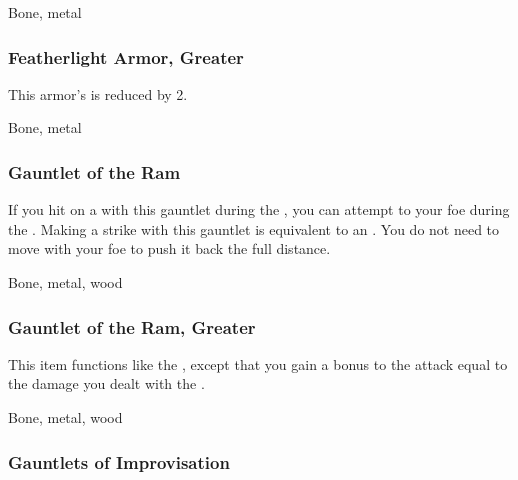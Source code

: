  Bone, metal


\lowercase{\hypertarget{item:Featherlight Armor, Greater}{}}\label{item:Featherlight Armor, Greater}
\hypertarget{item:Featherlight Armor, Greater}{\subsubsection{Featherlight Armor, Greater\hfill{}}}

This armor's  is reduced by 2.



 Bone, metal


\lowercase{\hypertarget{item:Gauntlet of the Ram}{}}\label{item:Gauntlet of the Ram}
\hypertarget{item:Gauntlet of the Ram}{\subsubsection{Gauntlet of the Ram\hfill{}}}

If you hit on a  with this gauntlet during the , you can attempt to  your foe during the .
Making a strike with this gauntlet is equivalent to an .
You do not need to move with your foe to push it back the full distance.



 Bone, metal, wood


\lowercase{\hypertarget{item:Gauntlet of the Ram, Greater}{}}\label{item:Gauntlet of the Ram, Greater}
\hypertarget{item:Gauntlet of the Ram, Greater}{\subsubsection{Gauntlet of the Ram, Greater\hfill{}}}

This item functions like the , except that you gain a bonus to the  attack equal to the damage you dealt with the .



 Bone, metal, wood


\lowercase{\hypertarget{item:Gauntlets of Improvisation}{}}\label{item:Gauntlets of Improvisation}
\hypertarget{item:Gauntlets of Improvisation}{\subsubsection{Gauntlets of Improvisation\hfill{}}}

